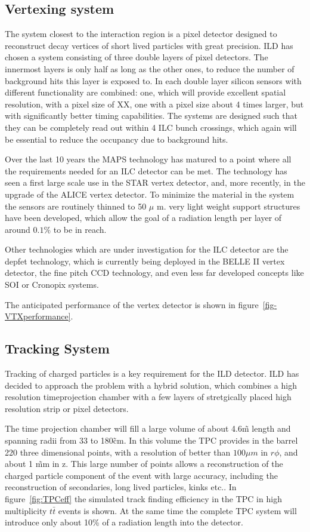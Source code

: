 \documentclass[%
 preprint,
 amsmath,amssymb,
 aps,
]{revtex4-1}
\begin{document}
 
\subsection{Vertexing system}
The system closest to the interaction region is a pixel detector designed to reconstruct decay vertices of short lived particles with great precision. ILD has chosen a system consisting of three double layers of pixel detectors. The innermost layers is only half as long as the other ones, to reduce the number of background hits this layer is exposed to. In each double layer silicon sensors with different functionality are combined: one, which will provide excellent spatial resolution, with a pixel size of XX, one with a pixel size about 4 times larger, but with significantly better timing capabilities. The systems are designed such that they can be completely read out within 4 ILC bunch crossings, which again will be essential to reduce the occupancy due to background hits. 

Over the last 10 years the MAPS technology has matured to a point where all the requirements needed for an ILC detector can be met. The technology has seen a first large scale use in the STAR vertex detector, and, more recently, in the upgrade of the ALICE vertex detector. To minimize the material in the system the sensors are routinely thinned to 50 $\mu$ m. very light weight support structures have been developed, which allow the goal of a radiation length per layer of around $0.1 \%$ to be in reach. 

Other technologies which are under investigation for the ILC detector are the depfet technology, which is currently being deployed in the BELLE II vertex detector, the fine pitch CCD technology, and even less far developed concepts like SOI or Cronopix systems. 

The anticipated performance of the vertex detector is shown in figure~\ref{fig-VTXperformance}.  

\subsection{Tracking System}

Tracking of charged particles is a key requirement for the ILD detector. ILD has decided to approach the problem with a hybrid solution, which combines a high resolution timeprojection chamber with a few layers of stretgically placed high resolution strip or pixel detectors. 

The time projection chamber will fill a large volume of about 4.6\~m length and spanning radii from 33 to 180\~cm. In this volume the TPC provides in the barrel 220 three dimensional points, with a resolution of better than $100 \mu m$ in $r \phi$, and about 1 \~mm in z. This large number of points allows a reconstruction of the charged particle component of the event with large accuracy, including the reconstruction of secondaries, long lived particles, kinks etc.. In figure~\ref{fig:TPCeff} the simulated track finding efficiency in the TPC in high multiplicity $t \bar t$ events is shown. At the same time the complete TPC system will introduce only about 10\% of a radiation length into the detector. 
\end{document}
